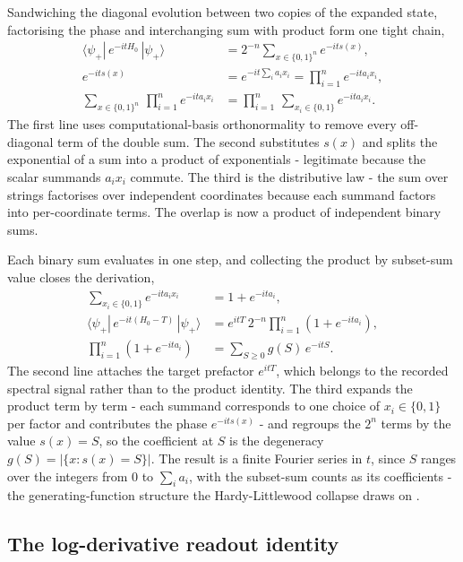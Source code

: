 Sandwiching the diagonal evolution between two copies of the expanded state, factorising the phase and interchanging sum with product form one tight chain,
\begin{align*}
\langle \psi_+ | \, e^{-i t H_0} \, | \psi_+ \rangle
&= 2^{-n} \sum_{x \in \{0,1\}^n} e^{-i t s(x)} , \\
e^{-i t s(x)} &= e^{-i t \sum_i a_i x_i} = \prod_{i=1}^{n} e^{-i t a_i x_i} , \\
\sum_{x \in \{0,1\}^n} \, \prod_{i=1}^{n} e^{-i t a_i x_i}
&= \prod_{i=1}^{n} \, \sum_{x_i \in \{0,1\}} e^{-i t a_i x_i} .
\end{align*}
The first line uses computational-basis orthonormality to remove every off-diagonal term of the double sum. The second substitutes $s(x)$ and splits the exponential of a sum into a product of exponentials - legitimate because the scalar summands $a_i x_i$ commute. The third is the distributive law - the sum over strings factorises over independent coordinates because each summand factors into per-coordinate terms. The overlap is now a product of independent binary sums.

Each binary sum evaluates in one step, and collecting the product by subset-sum value closes the derivation,
\begin{align*}
\sum_{x_i \in \{0,1\}} e^{-i t a_i x_i} &= 1 + e^{-i t a_i} , \\
\langle \psi_+ | \, e^{-i t (H_0 - T)} \, | \psi_+ \rangle
&= e^{i t T} \, 2^{-n} \prod_{i=1}^{n} \left( 1 + e^{-i t a_i} \right) , \\
\prod_{i=1}^{n} \left( 1 + e^{-i t a_i} \right)
&= \sum_{S \ge 0} g(S) \, e^{-i t S} .
\end{align*}
The second line attaches the target prefactor $e^{i t T}$, which belongs to the recorded spectral signal rather than to the product identity. The third expands the product term by term - each summand corresponds to one choice of $x_i \in \{0,1\}$ per factor and contributes the phase $e^{-i t s(x)}$ - and regroups the $2^n$ terms by the value $s(x) = S$, so the coefficient at $S$ is the degeneracy $g(S) = |\{ x : s(x) = S \}|$. The result is a finite Fourier series in $t$, since $S$ ranges over the integers from $0$ to $\sum_i a_i$, with the subset-sum counts as its coefficients - the generating-function structure the Hardy-Littlewood collapse draws on \cite{vaughan1997hardy}.

\subsection*{The log-derivative readout identity}

